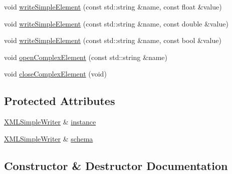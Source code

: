 \begin{DoxyCompactItemize}
void \mbox{\hyperlink{classXMLWriterAPI_1_1XMLSimpleSchemaWriter_aea7726895cd925dac93eaad7c339a898}{write\+Simple\+Element}} (const std\+::string \&name, const float \&value)
\item 
void \mbox{\hyperlink{classXMLWriterAPI_1_1XMLSimpleSchemaWriter_adca0f83d1ac6848cdd95ad8b82ebcc1c}{write\+Simple\+Element}} (const std\+::string \&name, const double \&value)
\item 
void \mbox{\hyperlink{classXMLWriterAPI_1_1XMLSimpleSchemaWriter_aecd8faa2f1b2411dc108007c05bdb339}{write\+Simple\+Element}} (const std\+::string \&name, const bool \&value)
\item 
void \mbox{\hyperlink{classXMLWriterAPI_1_1XMLSimpleSchemaWriter_a136a57c1860b0baa0fd6b877f4dce4bc}{open\+Complex\+Element}} (const std\+::string \&name)
\item 
void \mbox{\hyperlink{classXMLWriterAPI_1_1XMLSimpleSchemaWriter_a48be6d4cbc08f03e9e76fa94107c4b8a}{close\+Complex\+Element}} (void)
\end{DoxyCompactItemize}
\subsection*{Protected Attributes}
\begin{DoxyCompactItemize}
\item 
\mbox{\hyperlink{classXMLWriterAPI_1_1XMLSimpleWriter}{X\+M\+L\+Simple\+Writer}} \& \mbox{\hyperlink{classXMLWriterAPI_1_1XMLSimpleSchemaWriter_acad25faff4c5f64554d85a075e232b19}{instance}}
\item 
\mbox{\hyperlink{classXMLWriterAPI_1_1XMLSimpleWriter}{X\+M\+L\+Simple\+Writer}} \& \mbox{\hyperlink{classXMLWriterAPI_1_1XMLSimpleSchemaWriter_a97a86e85c4750599a68ab4a318c2d11d}{schema}}
\end{DoxyCompactItemize}


\subsection{Constructor \& Destructor Documentation}
\mbox{\label{classXMLWriterAPI_1_1XMLSimpleSchemaWriter_a309425b6927188991ba8fb9d19e0caca}} 
